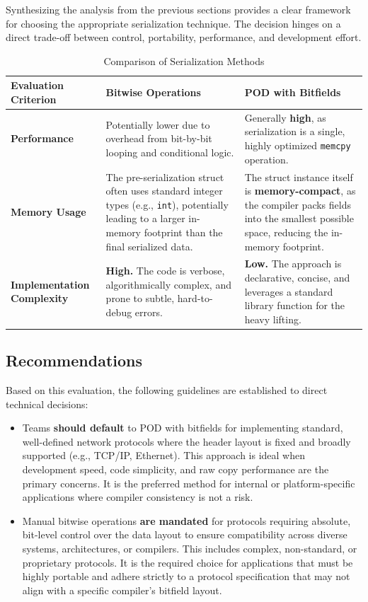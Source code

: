 \documentclass{article}
\begin{document}
Synthesizing the analysis from the previous sections provides a clear framework for choosing the appropriate serialization technique. The decision hinges on a direct trade-off between control, portability, performance, and development effort.
\begin{table}[h]
\centering
\caption{Comparison of Serialization Methods}
\label{tab:comparison}
\begin{tabular}{l p{} p{}}
\toprule
\textbf{Evaluation Criterion} & \textbf{Bitwise Operations} & \textbf{POD with Bitfields} \\
\midrule
\textbf{Performance} & Potentially lower due to overhead from bit-by-bit looping and conditional logic. & Generally \textbf{high}, as serialization is a single, highly optimized \texttt{memcpy} operation. \\
\textbf{Memory Usage} & The pre-serialization struct often uses standard integer types (e.g., \texttt{int}), potentially leading to a larger in-memory footprint than the final serialized data. & The struct instance itself is \textbf{memory-compact}, as the compiler packs fields into the smallest possible space, reducing the in-memory footprint. \\
\textbf{Implementation Complexity} & \textbf{High.} The code is verbose, algorithmically complex, and prone to subtle, hard-to-debug errors. & \textbf{Low.} The approach is declarative, concise, and leverages a standard library function for the heavy lifting. \\
\bottomrule
\end{tabular}
\end{table}

\subsection{Recommendations}

Based on this evaluation, the following guidelines are established to direct technical decisions:

\begin{itemize}
    \item Teams \textbf{should default} to POD with bitfields for implementing standard, well-defined network protocols where the header layout is fixed and broadly supported (e.g., TCP/IP, Ethernet). This approach is ideal when development speed, code simplicity, and raw copy performance are the primary concerns. It is the preferred method for internal or platform-specific applications where compiler consistency is not a risk.
    \item Manual bitwise operations \textbf{are mandated} for protocols requiring absolute, bit-level control over the data layout to ensure compatibility across diverse systems, architectures, or compilers. This includes complex, non-standard, or proprietary protocols. It is the required choice for applications that must be highly portable and adhere strictly to a protocol specification that may not align with a specific compiler's bitfield layout.
\end{itemize}
\end{document}
